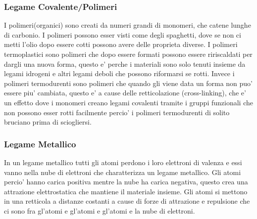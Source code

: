 \documentclass{article}
\begin{document}
                \subsubsection{Legame Covalente/Polimeri}
                    I polimeri(organici) sono creati da numeri grandi di monomeri, che catene lunghe di carbonio.
                    I polimeri possono esser visti come degli spaghetti, dove se non ci metti l'olio dopo essere cotti possono avere delle proprieta diverse.
                    \newline \newline I polimeri termoplastici sono polimeri che dopo essere formati possono essere ririscaldati per dargli una nuova forma,
                    questo e' perche i materiali sono solo tenuti insieme da legami idrogeni e altri legami deboli che possono riformarsi se rotti.
                    Invece i polimeri termodurenti sono polimeri che quando gli viene data un forma non puo' essere piu' cambiata, questo
                    e' a cause delle retticolazione (cross-linking), che e' un effetto dove i monomeri creano legami covalenti tramite i gruppi funzionali che
                    non possono esser rotti facilmente percio' i polimeri termodurenti di solito bruciano prima di sciogliersi.

                \subsubsection{Legame Metallico}
                    In un legame metallico tutti gli atomi perdono i loro elettroni di valenza e essi vanno nella nube di elettroni che charatterizza un legame metallico.
                    Gli atomi percio' hanno carica positiva mentre la nube ha carica negativa, questo crea una attrazione elettrostatica che mantiene il materiale insieme.
                    \newline Gli atomi si mettono in una retticola a distanze costanti a cause di forze di attrazione e repulsione che ci sono fra gl'atomi e gl'atomi e gl'atomi e la nube di elettroni.
            
\end{document}
